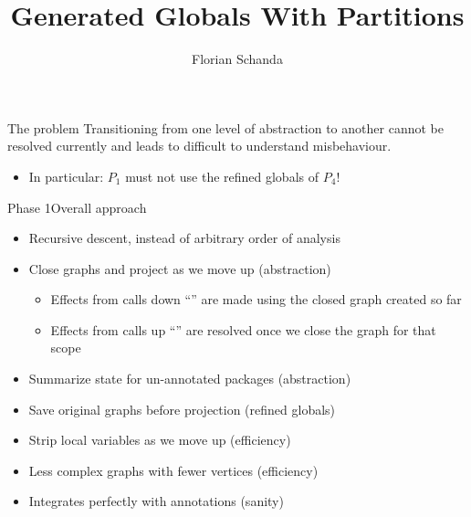 \documentclass[xcolor={dvipsnames}]{beamer}
\title{Generated Globals With Partitions}
\author{Florian Schanda}
\begin{document}
\maketitle

\begin{frame}{The problem}
  Transitioning from one level of abstraction to another cannot be resolved
  currently and leads to difficult to understand misbehaviour.

  \begin{center}
  \end{center}

  \begin{itemize}
  \item<2->In particular: $P_1$ must not use the refined globals of $P_4$!
  \end{itemize}
\end{frame}

\begin{frame}{Phase 1}{Overall approach}
  \begin{itemize}
  \item Recursive descent, instead of arbitrary order of analysis
  \item Close graphs and project as we move up (abstraction)
    \begin{itemize}
    \item Effects from calls down ``'' are made using the
      closed graph created so far
    \item Effects from calls up ``'' are resolved once we
      close the graph for that scope
    \end{itemize}
  \item Summarize state for un-annotated packages (abstraction)
  \item Save original graphs before projection (refined globals)
  \item Strip local variables as we move up (efficiency)
  \item Less complex graphs with fewer vertices (efficiency)
  \item Integrates perfectly with annotations (sanity)
  \end{itemize}
\end{frame}
\end{document}
